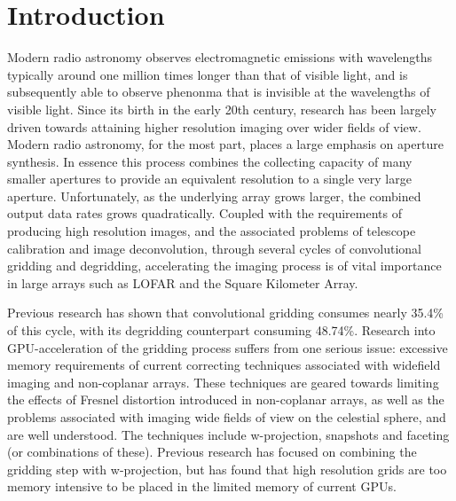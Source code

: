 \documentclass[a4paper,11pt,two column]{article}
\begin{document}
\saythanks
\section{Introduction}
Modern radio astronomy observes electromagnetic emissions with wavelengths typically around one million times longer than that of visible light, and is subsequently able to observe phenonma that is 
invisible at the wavelengths of visible light. Since its birth in the early 20th century, research has been largely driven towards attaining higher resolution imaging over wider fields of view. Modern 
radio astronomy, for the most part, places a large emphasis on aperture synthesis. In essence this process combines the collecting capacity of many smaller apertures to provide an equivalent
resolution to a single very large aperture. Unfortunately, as the underlying array grows larger, the combined output data rates grows quadratically. Coupled with the requirements of producing
high resolution images, and the associated problems of telescope calibration and image deconvolution, through several cycles of convolutional gridding and degridding, accelerating the imaging 
process is of vital importance in large arrays such as LOFAR and the Square Kilometer Array.

Previous research has shown that convolutional gridding consumes nearly 35.4\% of this cycle, with its degridding counterpart consuming 48.74\%. Research into GPU-acceleration of the gridding 
process suffers from one serious issue: excessive memory requirements of current correcting techniques associated with widefield imaging and non-coplanar arrays. These techniques are 
geared towards limiting the effects of Fresnel distortion introduced in non-coplanar arrays, as well as the problems associated with imaging wide fields of view on the celestial sphere, 
and are well understood. The techniques include w-projection, snapshots and faceting (or combinations of these). Previous research has focused on combining the gridding step with w-projection, but has
found that high resolution grids are too memory intensive to be placed in the limited memory of current GPUs.
\end{document}
